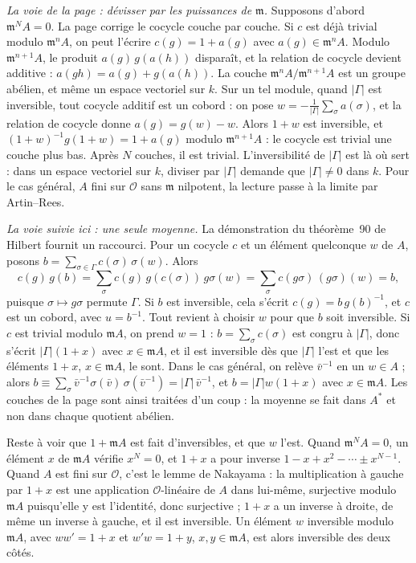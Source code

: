 \noindent\emph{La voie de la page : dévisser par les puissances de $\mathfrak m$.} Supposons d'abord $\mathfrak m^N A = 0$. La page corrige le cocycle couche par couche. Si $c$ est déjà trivial modulo $\mathfrak m^n A$, on peut l'écrire $c(g) = 1 + a(g)$ avec $a(g) \in \mathfrak m^n A$. Modulo $\mathfrak m^{n+1}A$, le produit $a(g)\,g(a(h))$ disparaît, et la relation de cocycle devient additive : $a(gh) = a(g) + g(a(h))$. La couche $\mathfrak m^n A/\mathfrak m^{n+1}A$ est un groupe abélien, et même un espace vectoriel sur $k$. Sur un tel module, quand $|\Gamma|$ est inversible, tout cocycle additif est un cobord : on pose $w = -\frac{1}{|\Gamma|}\sum_{\sigma} a(\sigma)$, et la relation de cocycle donne $a(g) = g(w) - w$. Alors $1 + w$ est inversible, et $(1+w)^{-1}g(1+w) = 1 + a(g)$ modulo $\mathfrak m^{n+1}A$ : le cocycle est trivial une couche plus bas. Après $N$ couches, il est trivial. L'inversibilité de $|\Gamma|$ est là où sert  : dans un espace vectoriel sur $k$, diviser par $|\Gamma|$ demande que $|\Gamma| \neq 0$ dans $k$. Pour le cas général, $A$ fini sur $\mathcal O$ sans $\mathfrak m$ nilpotent, la lecture passe à la limite par Artin--Rees.

\noindent\emph{La voie suivie ici : une seule moyenne.} La démonstration du théorème~90 de Hilbert fournit un raccourci. Pour un cocycle $c$ et un élément quelconque $w$ de $A$, posons $b = \sum_{\sigma \in \Gamma} c(\sigma)\,\sigma(w)$. Alors
\[
c(g)\, g(b) = \sum_\sigma c(g)\, g(c(\sigma))\, g\sigma(w) = \sum_\sigma c(g\sigma)\, (g\sigma)(w) = b,
\]
puisque $\sigma \mapsto g\sigma$ permute $\Gamma$. Si $b$ est inversible, cela s'écrit $c(g) = b\, g(b)^{-1}$, et $c$ est un cobord, avec $u = b^{-1}$. Tout revient à choisir $w$ pour que $b$ soit inversible. Si $c$ est trivial modulo $\mathfrak mA$, on prend $w = 1$ : $b = \sum_\sigma c(\sigma)$ est congru à $|\Gamma|$, donc s'écrit $|\Gamma|(1 + x)$ avec $x \in \mathfrak mA$, et il est inversible dès que $|\Gamma|$ l'est et que les éléments $1 + x$, $x \in \mathfrak mA$, le sont. Dans le cas général, on relève $\bar v^{-1}$ en un $w \in A$ ; alors $b \equiv \sum_\sigma \bar v^{-1}\sigma(\bar v)\,\sigma(\bar v^{-1}) = |\Gamma|\, \bar v^{-1}$, et $b = |\Gamma| w (1 + x)$ avec $x \in \mathfrak mA$. Les couches de la page sont ainsi traitées d'un coup : la moyenne se fait dans $A^*$ et non dans chaque quotient abélien.

Reste à voir que $1 + \mathfrak mA$ est fait d'inversibles, et que $w$ l'est. Quand $\mathfrak m^NA = 0$, un élément $x$ de $\mathfrak mA$ vérifie $x^N = 0$, et $1 + x$ a pour inverse $1 - x + x^2 - \cdots \pm x^{N-1}$. Quand $A$ est fini sur $\mathcal O$, c'est le lemme de Nakayama : la multiplication à gauche par $1 + x$ est une application $\mathcal O$-linéaire de $A$ dans lui-même, surjective modulo $\mathfrak mA$ puisqu'elle y est l'identité, donc surjective ; $1 + x$ a un inverse à droite, de même un inverse à gauche, et il est inversible. Un élément $w$ inversible modulo $\mathfrak mA$, avec $ww' = 1 + x$ et $w'w = 1 + y$, $x, y \in \mathfrak mA$, est alors inversible des deux côtés.

